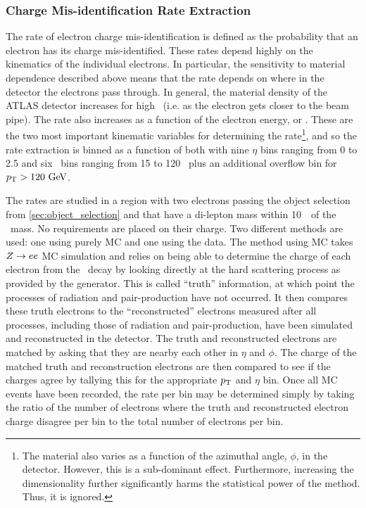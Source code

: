 \subsubsection{Charge Mis-identification Rate Extraction}
\label{sec:chargemisd_rates}

The rate of electron charge mis-identification is defined as 
the probability that an electron has its charge mis-identified.
These rates depend highly on the kinematics of the individual electrons.
In particular, the sensitivity to material dependence described above 
means that the rate depends on where in the detector the electrons
pass through. In general, the material density of the ATLAS
detector increases for high \eta~(i.e. as the electron gets closer to the
beam pipe).  %
The rate also increases as a function of the electron energy, 
or \pt. These are the two most important kinematic variables for determining
the rate\footnote{The material also varies as a function of the azimuthal angle,
$\phi$, in the detector. However, this is a sub-dominant effect. Furthermore,
increasing the dimensionality further significantly harms the statistical 
power of the method. Thus, it is ignored.}, and 
so the rate extraction is binned as a function of both with nine $\eta$ 
bins ranging from 0 to 2.5 and six \pt~bins ranging from 15 to 120 \GeV~plus
an additional overflow bin for $\pt>120\GeV$.



The rates are studied in a region with two electrons passing the object
selection from \sec\ref{sec:object_selection} and that have
a di-lepton mass within 10~\GeV~of the \z~mass. No requirements are placed
on their charge. Two different methods
are used: one using purely MC and one using the data.
The method using MC takes $Z\rightarrow ee$ MC simulation 
and relies on being able to determine the charge of each electron from the 
\z~decay by looking 
directly at the hard scattering process as provided by the generator.
This is called ``truth'' information, at which point the processes of radiation
and pair-production have not occurred. It then compares
these truth electrons to the ``reconstructed'' electrons 
measured after all processes, including those of radiation and pair-production,
have been simulated and reconstructed
in the detector. The truth and reconstructed electrons
are matched by asking that they are nearby each other in $\eta$ and $\phi$.
The charge of the matched truth and reconstruction electrons 
are then compared to see if 
the charges agree
by tallying  this 
for the appropriate $p_{\mathrm{T}}$ and $\eta$ bin. Once all MC events
have been recorded, the rate per bin may be determined simply 
by taking the ratio of the number of electrons where the truth and reconstructed
electron charge disagree per bin to the total number of electrons per bin. 

